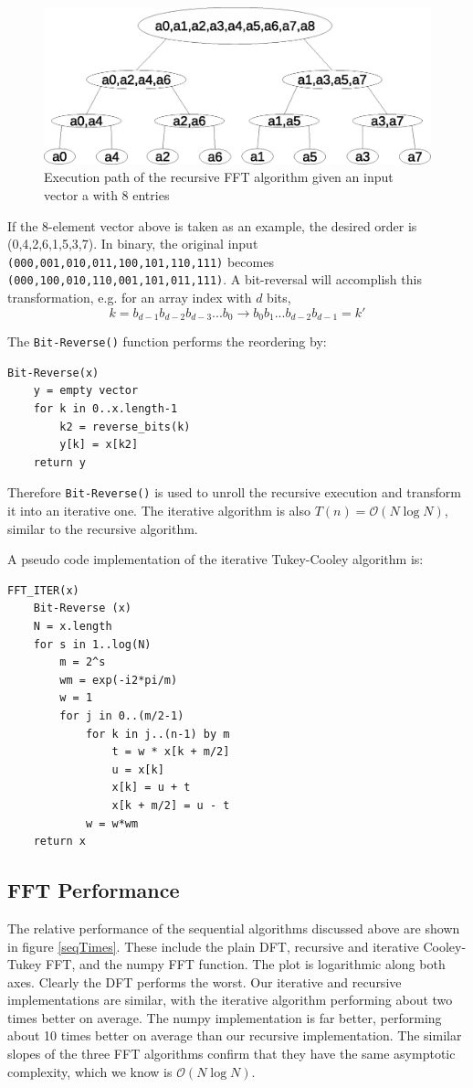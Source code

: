 \begin{figure}[h]
\center
\includegraphics[scale=0.5]{img/recursive_fft_execution.eps}
\caption{Execution path of the recursive FFT algorithm given an input vector a with 8 entries}
\end{figure}

If the 8-element vector above is taken as an example, the desired order is (0,4,2,6,1,5,3,7). In binary, the original input \texttt{(000,001,010,011,100,101,110,111)} becomes \texttt{(000,100,010,110,001,101,011,111)}. A bit-reversal will accomplish this transformation, e.g. for an array index with $d$ bits,
\[
k = b_{d-1}b_{d-2}b_{d-3}...b_0 \rightarrow b_0b_1...b_{d-2}b_{d-1} = k'
\]

The \texttt{Bit-Reverse()} function performs the reordering by:
\begin{lstlisting}
Bit-Reverse(x)
    y = empty vector
    for k in 0..x.length-1
        k2 = reverse_bits(k)
        y[k] = x[k2]
    return y
\end{lstlisting}

Therefore \texttt{Bit-Reverse()} is used to unroll the recursive execution and transform it into an iterative one. The iterative algorithm is also $T(n) = \mathcal{O}(N \log N)$, similar to the recursive algorithm.

A pseudo code implementation of the iterative Tukey-Cooley algorithm is:
\begin{lstlisting}
FFT_ITER(x)
    Bit-Reverse (x)
    N = x.length
    for s in 1..log(N)
        m = 2^s
        wm = exp(-i2*pi/m)
        w = 1
        for j in 0..(m/2-1)
            for k in j..(n-1) by m
                t = w * x[k + m/2]
                u = x[k]
                x[k] = u + t
                x[k + m/2] = u - t
            w = w*wm
    return x
\end{lstlisting}

\subsection{FFT Performance}
The relative performance of the sequential algorithms discussed above are shown in figure \ref{seqTimes}. These include the plain DFT, recursive and iterative Cooley-Tukey FFT, and the numpy FFT function. The plot is logarithmic along both axes. Clearly the DFT performs the worst. Our iterative and recursive implementations are similar, with the iterative algorithm performing about two times better on average. The numpy implementation is far better, performing about 10 times better on average than our recursive implementation. The similar slopes of the three FFT algorithms confirm that they have the same asymptotic complexity, which we know is $\mathcal{O}(N\log N)$.

